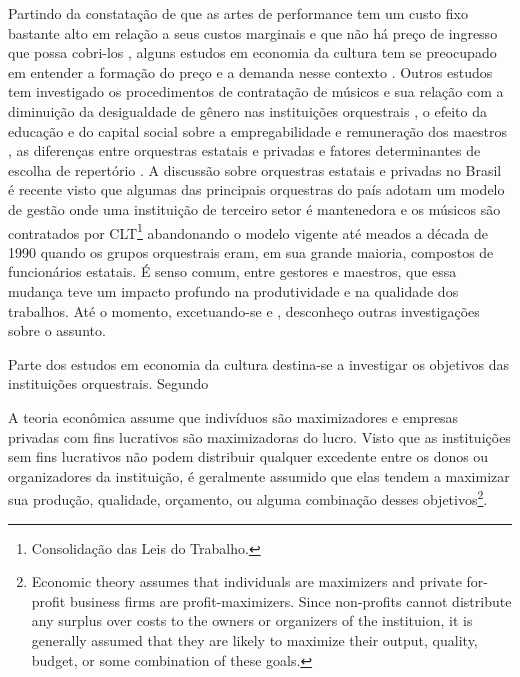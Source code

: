 \documentclass[a4paper, 12pt, openright, oneside, german, french, english, brazil]{abntex2}
\begin{document}
	Partindo da constatação de que as artes de performance tem um custo fixo bastante alto em relação a seus custos marginais e que não há preço de ingresso que possa cobri-los , alguns estudos em economia da cultura tem se preocupado em entender a formação do preço e a demanda nesse contexto \cite{lange1984demand,luksetich1995simultaneous,felton1992assumed,felton1994evidence,seaman1987price}. Outros estudos tem investigado os procedimentos de contratação de músicos e sua relação com a diminuição da desigualdade de gênero nas instituições orquestrais \cite{goldin1997orchestrating}, o efeito da educação e do capital social sobre a empregabilidade e remuneração dos maestros ,  as diferenças entre orquestras estatais e privadas \cite{boyle2007ownership} e fatores determinantes de escolha de repertório \cite{luksetich2008effects}. A discussão sobre orquestras estatais e privadas no Brasil é recente visto que algumas das principais orquestras do país adotam um modelo de gestão onde uma instituição de terceiro setor é mantenedora e os músicos são contratados por CLT\footnote{Consolidação das Leis do Trabalho.} abandonando o modelo vigente até meados a década de 1990 quando os grupos orquestrais eram, em sua grande maioria, compostos de funcionários estatais. É senso comum, entre gestores e maestros, que essa mudança teve um impacto profundo na produtividade e na qualidade dos trabalhos. Até o momento, excetuando-se  e , desconheço outras investigações sobre o assunto.
	
	Parte dos estudos em economia da cultura destina-se a investigar os objetivos das instituições orquestrais. Segundo 
	
	\begin{citacao}
		A teoria econômica assume que indivíduos são maximizadores e empresas privadas com fins lucrativos são maximizadoras do lucro. Visto que as instituições sem fins lucrativos não podem distribuir qualquer excedente entre os donos ou organizadores da instituição, é geralmente assumido que elas tendem a maximizar sua produção, qualidade, orçamento, ou alguma combinação desses objetivos\footnote{Economic theory assumes that individuals are maximizers and private for-profit business firms are profit-maximizers. Since non-profits cannot distribute any surplus over costs to the owners or organizers of the instituion, it is generally assumed that they are likely to maximize their output, quality, budget, or some combination of these goals.}. \cite[p. 323]{luksetich2011orchestras}
	\end{citacao}
	
\end{document}
